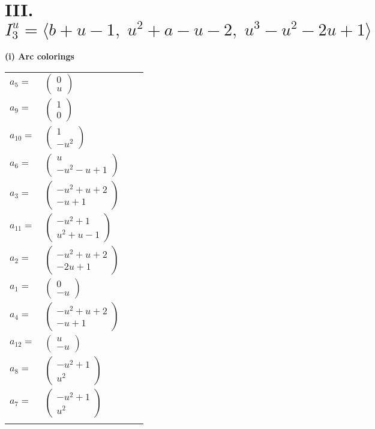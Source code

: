 \documentclass[1p]{elsarticle_modified}
\theoremstyle{definition}
\begin{document}
\centering \section*{III. $I^u_{3}= \langle b+u-1,\;u^2+a- u-2,\;u^3- u^2-2 u+1 \rangle$}
\flushleft \textbf{(i) Arc colorings}\\
\begin{tabular}{m{7pt} m{180pt} m{7pt} m{180pt} }
\flushright $a_{5}=$&$\begin{pmatrix}0\\u\end{pmatrix}$ \\
\flushright $a_{9}=$&$\begin{pmatrix}1\\0\end{pmatrix}$ \\
\flushright $a_{10}=$&$\begin{pmatrix}1\\- u^2\end{pmatrix}$ \\
\flushright $a_{6}=$&$\begin{pmatrix}u\\- u^2- u+1\end{pmatrix}$ \\
\flushright $a_{3}=$&$\begin{pmatrix}- u^2+u+2\\- u+1\end{pmatrix}$ \\
\flushright $a_{11}=$&$\begin{pmatrix}- u^2+1\\u^2+u-1\end{pmatrix}$ \\
\flushright $a_{2}=$&$\begin{pmatrix}- u^2+u+2\\-2 u+1\end{pmatrix}$ \\
\flushright $a_{1}=$&$\begin{pmatrix}0\\- u\end{pmatrix}$ \\
\flushright $a_{4}=$&$\begin{pmatrix}- u^2+u+2\\- u+1\end{pmatrix}$ \\
\flushright $a_{12}=$&$\begin{pmatrix}u\\- u\end{pmatrix}$ \\
\flushright $a_{8}=$&$\begin{pmatrix}- u^2+1\\u^2\end{pmatrix}$ \\
\flushright $a_{7}=$&$\begin{pmatrix}- u^2+1\\u^2\end{pmatrix}$\\&\end{tabular}
\end{document}
